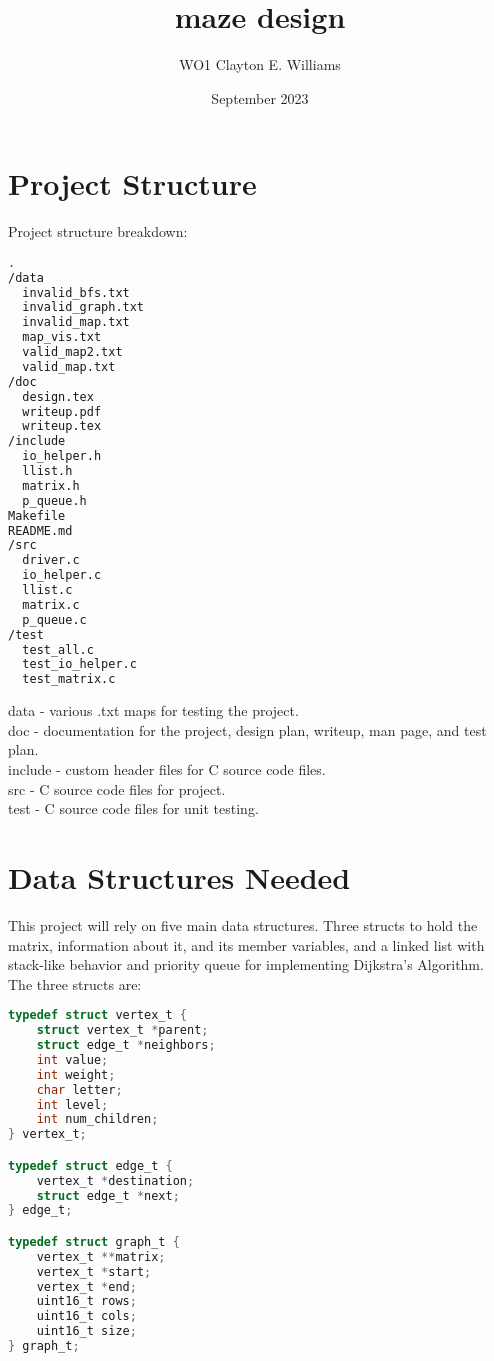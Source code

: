 \documentclass{article}
\title{maze design}
\author{WO1 Clayton E. Williams}
\date{September 2023}
\begin{document}
\maketitle

\section{Project Structure}
\noindent Project structure breakdown:
\begin{lstlisting}[language=bash]
.
/data
  invalid_bfs.txt
  invalid_graph.txt
  invalid_map.txt
  map_vis.txt
  valid_map2.txt
  valid_map.txt
/doc
  design.tex
  writeup.pdf
  writeup.tex
/include
  io_helper.h
  llist.h
  matrix.h
  p_queue.h
Makefile
README.md
/src
  driver.c
  io_helper.c
  llist.c
  matrix.c
  p_queue.c
/test
  test_all.c
  test_io_helper.c
  test_matrix.c
\end{lstlisting}
\noindent data - various .txt maps for testing the project.\\
\noindent doc - documentation for the project, design plan, writeup, man page, and test plan.\\
\noindent include - custom header files for C source code files.\\
\noindent src - C source code files for project.\\
\noindent test - C source code files for unit testing.\\

\section{Data Structures Needed}
\noindent This project will rely on five main data structures. Three structs to hold the matrix, information about it, and its member variables, and a linked list with stack-like behavior and priority queue for implementing Dijkstra's Algorithm. The three structs are:
\begin{lstlisting}[language=C]
typedef struct vertex_t {
	struct vertex_t *parent;
	struct edge_t *neighbors;
	int value;
	int weight;
	char letter;
	int level;
	int num_children;
} vertex_t;

typedef struct edge_t {
	vertex_t *destination;
	struct edge_t *next;
} edge_t;

typedef struct graph_t {
	vertex_t **matrix;
	vertex_t *start;
	vertex_t *end;
	uint16_t rows;
	uint16_t cols;
	uint16_t size;
} graph_t;
\end{lstlisting}
\end{document}
